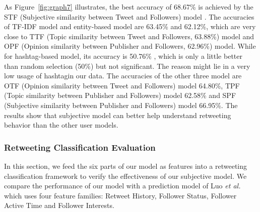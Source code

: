 \documentclass{acm_proc_article-sp}
\begin{document}
As Figure~\ref{fig:graph7} illustrates, the best accuracy of 68.67\% is achieved by the STF (Subjective similarity between Tweet and Followers) model .
The accuracies of TF-IDF model and entity-based model are 63.45\% and 62.12\%, which are very close to TTF (Topic similarity between Tweet and Followers, 63.88\%) model and OPF (Opinion similarity between Publisher and Followers, 62.96\%) model.
While for hashtag-based model, its accuracy is  50.76\% , which is only a little better than random selection (50\%) but not significant. The reason might lie in a very low usage of hashtagin our data. 
The accuracies of the other three model are OTF (Opinion similarity between Tweet and Followers) model 64.80\%, TPF (Topic similarity between Publisher and Followers) model 62.58\% and SPF (Subjective similarity between Publisher and Followers) model 66.95\%.
The results show that subjective model can better help understand retweeting behavior than the other user models.

\subsubsection{Retweeting Classification Evaluation}
\label{classifiction}
In this section, we feed the six parts of our model as features into a retweeting classification framework to verify the effectiveness of our subjective model. 
We compare the performance of our model with a prediction model of Luo \emph{et al.}~\cite{Luo:2013RMF} which uses four feature families: Retweet History, Follower Status, Follower Active Time and Follower Interests.
\end{document}
